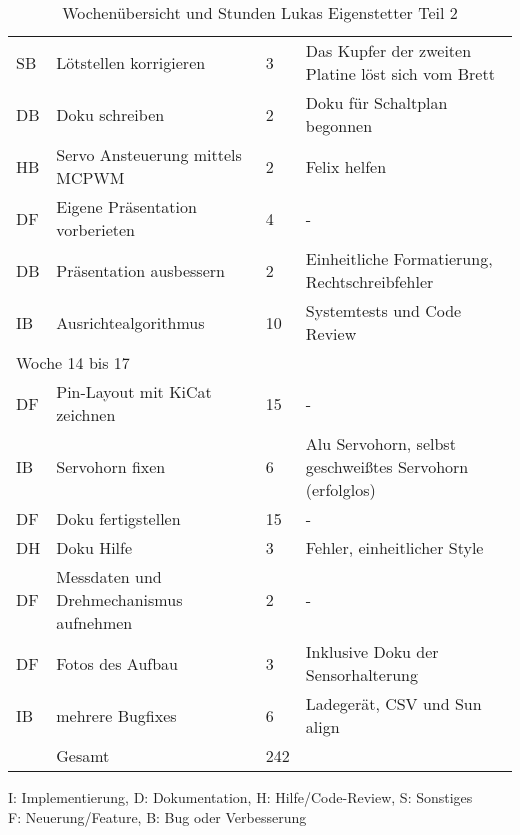 \begin{table}[!hp]
\begin{center}
\begin{tabular}{|p{0.8cm}|p{6cm}|p{0.8cm}|p{8cm}|}
        SB & Lötstellen korrigieren                 & 3 & Das Kupfer der zweiten Platine löst sich vom Brett \\
        DB & Doku schreiben                          & 2 & Doku für Schaltplan begonnen \\
        HB & Servo Ansteuerung mittels MCPWM        & 2 & Felix helfen\\
        DF & Eigene Präsentation vorberieten        & 4 & - \\
        DB & Präsentation ausbessern      & 2 & Einheitliche Formatierung, Rechtschreibfehler\\
        IB & Ausrichtealgorithmus         & 10 & Systemtests und Code Review                 \\ \hline
        \multicolumn{4}{|l|}{Woche 14 bis 17}                                                           \\ \hline
        DF & Pin-Layout mit KiCat zeichnen          & 15 & - \\
        IB & Servohorn fixen                        & 6 & Alu Servohorn, selbst geschweißtes Servohorn (erfolglos) \\
        DF & Doku fertigstellen                     & 15 & - \\
        DH & Doku Hilfe                & 3 & Fehler, einheitlicher Style\\        
        DF & Messdaten und Drehmechanismus aufnehmen & 2 & - \\ 
        DF & Fotos des Aufbau & 3 & Inklusive Doku der Sensorhalterung \\
        IB & mehrere Bugfixes & 6 & Ladegerät, CSV und Sun align \\ 
        \Xhline{3\arrayrulewidth}
        & Gesamt & 242 & \\ \hline
    \end{tabular}
    \end{center}
    \label{tab:overviewLukas2}
    \caption{Wochenübersicht und Stunden Lukas Eigenstetter Teil 2}
    I: Implementierung, D: Dokumentation, H: Hilfe/Code-Review, S: Sonstiges\\
        F: Neuerung/Feature, B: Bug oder Verbesserung
\end{table}
\vspace{1em}

\newpage